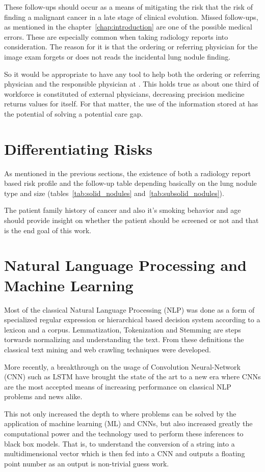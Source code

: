 These follow-ups should occur as a  means of mitigating the risk that the risk of finding a malignant cancer in a late stage of clinical evolution. Missed follow-ups, as mentioned in  the chapter~\ref{chap:introduction} are one of the possible medical errors. These are especially common when taking radiology reports into consideration. The reason for it is that the ordering or referring physician for the image exam forgets or does not reads the incidental lung nodule finding. 

So it would be appropriate to have any tool to help both the ordering or referring physician and the responsible physician at \nomeHsl{}. This holds true as about one third of \nomeHslShort{} workforce is constituted of external physicians, decreasing precision medicine returns values for itself. For that matter, the use of the information stored at \nomeHslShort{} has the potential of solving a potential care gap. 

\section{Differentiating Risks}

As mentioned in the previous sections, the existence of both a radiology report based risk profile and the follow-up table depending basically on the lung nodule type and  size (tables~\ref{tab:solid_nodules} and~\ref{tab:subsolid_nodules}). 

The patient family history of cancer and also it's smoking behavior and age should provide insight on whether the patient should be screened or not and that is the end goal of this work.

\section{Natural Language Processing and Machine Learning}

Most of the classical Natural Language Processing (NLP) was done as a form of specialized regular expression or hierarchical based decision system according to a lexicon and a corpus. Lemmatization, Tokenization and Stemming are steps torwards normalizing and understanding the text. From these definitions the classical text mining and web crawling techniques were developed\cite{hripcsak2002, elkinNlp2008, danforth2012}. 

More recently, a breakthrough on the usage of Convolution Neural-Network (CNN) such as LSTM have brought the state of the art to a new era where CNNs are the most accepted means of increasing performance on classical NLP problems and news alike\cite{kang2019, jungmann2019}. 

This not only increased the depth to where problems can be solved by the application of machine learning (ML) and CNNs, but also increased greatly the computational power and the technology used to perform these inferences to black box models. That is, to understand the conversion of a string into a multidimensional vector which is then fed into a CNN and outputs a floating point number as an output is non-trivial guess work.
